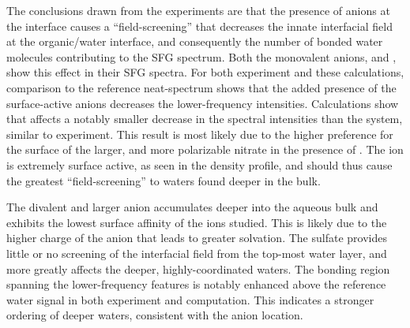 The conclusions drawn from the experiments are that the presence of anions at the interface causes a ``field-screening'' that decreases the innate interfacial field at the organic/water interface, and consequently the number of bonded water molecules contributing to the SFG spectrum. Both the monovalent anions, \cl and \nit, show this effect in their SFG spectra. For both experiment and these calculations, comparison to the reference neat-\wat spectrum shows that the added presence of the surface-active anions decreases the lower-frequency intensities. Calculations show that \cl affects a notably smaller decrease in the spectral intensities than the \nit system, similar to experiment. This result is most likely due to the higher preference for the surface of the larger, and more polarizable nitrate in the presence of \ctc. The \nit ion is extremely surface active, as seen in the density profile, and should thus cause the greatest ``field-screening'' to waters found deeper in the bulk.

The divalent and larger \sul anion accumulates deeper into the aqueous bulk and exhibits the lowest surface affinity of the ions studied. This is likely due to the higher charge of the anion that leads to greater solvation. The sulfate provides little or no screening of the interfacial field from the top-most water layer, and more greatly affects the deeper, highly-coordinated waters. The bonding region spanning the lower-frequency features is notably enhanced above the reference water signal in both experiment and computation. This indicates a stronger ordering of deeper waters, consistent with the anion location.

